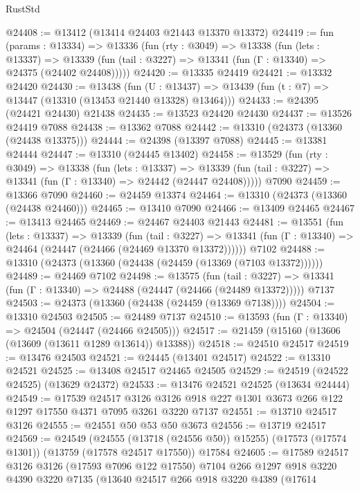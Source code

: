 \begin{lexlean}{RustStd}
\begin{coremodule}
@24408 := @13412 (@13414 @24403 @21443 @13370 @13372)
@24419 := fun (params : @13334) =>
  @13336
    (fun (rty : @3049) =>
    @13338
      (fun (lets : @13337) =>
      @13339 (fun (tail : @3227) => @13341 (fun (Γ : @13340) => @24375 (@24402 @24408)))))
@24420 := @13335 @24419
@24421 := @13332 @24420
@24430 := @13438
    (fun (U : @13437) => @13439 (fun (t : @7) => @13447 (@13310 (@13453 @21440 @13328) @13464)))
@24433 := @24395 (@24421 @24430) @21438
@24435 := @13523 @24420 @24430
@24437 := @13526 @24419 @7088
@24438 := @13362 @7088
@24442 := @13310 (@24373 (@13360 (@24438 @13375)))
@24444 := @24398 (@13397 @7088)
@24445 := @13381 @24444
@24447 := @13310 (@24445 @13402)
@24458 := @13529
    (fun (rty : @3049) =>
    @13338
      (fun (lets : @13337) =>
      @13339 (fun (tail : @3227) => @13341 (fun (Γ : @13340) => @24442 (@24447 @24408)))))
    @7090
@24459 := @13366 @7090
@24460 := @24459 @13374
@24464 := @13310 (@24373 (@13360 (@24438 @24460)))
@24465 := @13410 @7090
@24466 := @13409 @24465
@24467 := @13413 @24465
@24469 := @24467 @24403 @21443
@24481 := @13551
    (fun (lets : @13337) =>
    @13339
      (fun (tail : @3227) =>
      @13341 (fun (Γ : @13340) => @24464 (@24447 (@24466 (@24469 @13370 @13372))))))
    @7102
@24488 := @13310 (@24373 (@13360 (@24438 (@24459 (@13369 (@7103 @13372))))))
@24489 := @24469 @7102
@24498 := @13575
    (fun (tail : @3227) => @13341 (fun (Γ : @13340) => @24488 (@24447 (@24466 (@24489 @13372)))))
    @7137
@24503 := @24373 (@13360 (@24438 (@24459 (@13369 @7138))))
@24504 := @13310 @24503
@24505 := @24489 @7137
@24510 := @13593 (fun (Γ : @13340) => @24504 (@24447 (@24466 @24505)))
@24517 := @21459 (@15160 (@13606 (@13609 (@13611 @1289 @13614)) @13388))
@24518 := @24510 @24517
@24519 := @13476 @24503
@24521 := @24445 (@13401 @24517)
@24522 := @13310 @24521
@24525 := @13408 @24517 @24465 @24505
@24529 := @24519 (@24522 @24525) (@13629 @24372)
@24533 := @13476 @24521 @24525 (@13634 @24444)
@24549 := @17539
    @24517
    @3126
    @3126
    @918
    @227
    @1301
    @3673
    @266
    @122
    @1297
    @17550
    @4371
    @7095
    @3261
    @3220
    @7137
@24551 := @13710 @24517 @3126
@24555 := @24551 @50 @53 @50 @3673
@24556 := @13719 @24517
@24569 := @24549
    (@24555 (@13718 (@24556 @50)) @15255)
    (@17573 (@17574 @1301))
    (@13759 (@17578 @24517 @17550))
    @17584
@24605 := @17589
    @24517
    @3126
    @3126
    (@17593 @7096 @122 @17550)
    @7104
    @266
    @1297
    @918
    @3220
    @4390
    @3220
    @7135
    (@13640
      @24517
      @266
      @918
      @3220
      @4389
      (@17614

\end{coremodule}
\end{lexlean}
